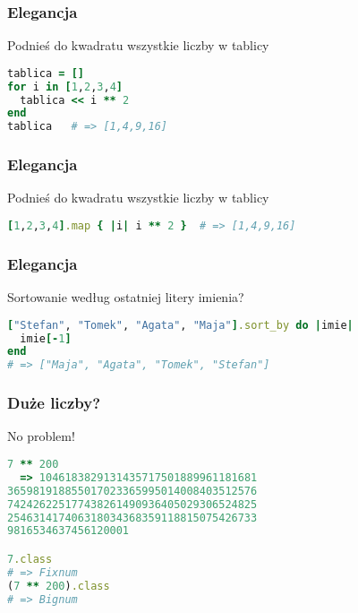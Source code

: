 \begin{frame}[fragile]
\frametitle{Elegancja}
\begin{block}{Podnieś do kwadratu wszystkie liczby w tablicy}
\begin{lstlisting}[language=Ruby]
tablica = []
for i in [1,2,3,4]
  tablica << i ** 2
end
tablica   # => [1,4,9,16]
\end{lstlisting}
\end{block}
\end{frame}

\begin{frame}[fragile]
\frametitle{Elegancja}
\begin{block}{Podnieś do kwadratu wszystkie liczby w tablicy}
\begin{lstlisting}[language=Ruby]
[1,2,3,4].map { |i| i ** 2 }  # => [1,4,9,16]
\end{lstlisting}
\end{block}
\end{frame}

\begin{frame}[fragile]
\frametitle{Elegancja}
\begin{block}{Sortowanie według ostatniej litery imienia?}
\begin{lstlisting}[language=Ruby]
["Stefan", "Tomek", "Agata", "Maja"].sort_by do |imie|
  imie[-1]
end
# => ["Maja", "Agata", "Tomek", "Stefan"]
\end{lstlisting}
\end{block}
\end{frame}


\begin{frame}[fragile]
\frametitle{Duże liczby?}
\begin{block}{No problem!}
\begin{lstlisting}[language=Ruby]
7 ** 200
  => 1046183829131435717501889961181681
365981918855017023365995014008403512576
742426225177438261490936405029306524825
254631417406318034368359118815075426733
9816534637456120001

7.class
# => Fixnum
(7 ** 200).class
# => Bignum
\end{lstlisting}
\end{block}
\end{frame}



